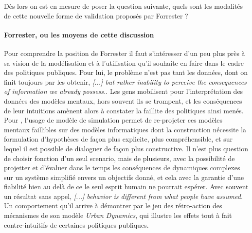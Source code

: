 Dès lors on est en mesure de poser la question suivante, quels sont les modalités de cette nouvelle forme de validation proposés par Forrester ?

\paragraph{Forrester, ou les moyens de cette discussion}



Pour comprendre la position de Forrester il faut s'intéresser d'un peu plus près à sa vision de la modélisation et à l'utilisation qu'il souhaite en faire dans le cadre des politiques publiques. Pour lui, le problème n'est pas tant les données, dont on finit toujours par les obtenir, \textit{ [...] but rather inability to perceive the consequences of information we already possess.}. Les gens mobilisent pour l'interprétation des données des modèles mentaux, hors souvent ils se trompent, et les conséquences de leur intuitions amènent alors à constater la faillite des politiques ainsi menés. Pour \textcite{Forrester1971}, l'usage de modèle de simulation permet de re-projeter ces modèles mentaux faillibles sur des modèles informatiques dont la construction nécessite la formulation d'hypothèses de façon plus explicite, plus compréhensible, et sur lequel il est possible de dialoguer de façon plus constructive. Il n'est plus question de choisir fonction d'un seul scenario, mais de plusieurs, avec la possibilité de projetter et d'évaluer dans le temps les conséquences de dynamiques complexes sur un système simplifié envers un objectifs donné, et cela avec la garantie d'une fiabilité bien au delà de ce le seul esprit humain ne pourrait espérer. Avec souvent un résultat sans appel, \textit{[...] behavior is different from what people have assumed.} Un comportement qu'il arrive à démontrer par le jeu des rétro-action des mécanismes de son modèle \textit{Urban Dynamics}, qui illustre les effets tout à fait contre-intuitifs de certaines politiques publiques.


